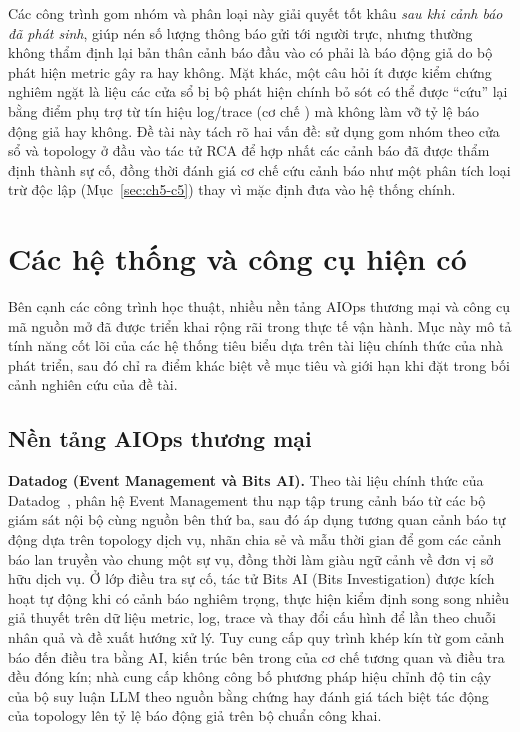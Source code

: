 Các công trình gom nhóm và phân loại này giải quyết tốt khâu \emph{sau khi cảnh báo đã phát sinh}, giúp nén số lượng thông báo gửi tới người trực, nhưng thường không thẩm định lại bản thân cảnh báo đầu vào có phải là báo động giả do bộ phát hiện metric gây ra hay không. Mặt khác, một câu hỏi ít được kiểm chứng nghiêm ngặt là liệu các cửa sổ bị bộ phát hiện chính bỏ sót có thể được ``cứu'' lại bằng điểm phụ trợ từ tín hiệu log/trace (cơ chế ) mà không làm vỡ tỷ lệ báo động giả hay không. Đề tài này tách rõ hai vấn đề: sử dụng gom nhóm theo cửa sổ và topology ở đầu vào tác tử RCA để hợp nhất các cảnh báo đã được \CTAV{} thẩm định thành sự cố, đồng thời đánh giá cơ chế cứu cảnh báo như một phân tích loại trừ độc lập (Mục~\ref{sec:ch5-c5}) thay vì mặc định đưa vào hệ thống chính.

\section{Các hệ thống và công cụ hiện có}
\label{sec:ch3-he-thong}

Bên cạnh các công trình học thuật, nhiều nền tảng AIOps thương mại và công cụ mã nguồn mở đã được triển khai rộng rãi trong thực tế vận hành. Mục này mô tả tính năng cốt lõi của các hệ thống tiêu biểu dựa trên tài liệu chính thức của nhà phát triển, sau đó chỉ ra điểm khác biệt về mục tiêu và giới hạn khi đặt trong bối cảnh nghiên cứu của đề tài.

\subsection{Nền tảng AIOps thương mại}
\label{sec:ch3-thuong-mai}

\textbf{Datadog (Event Management và Bits AI).} Theo tài liệu chính thức của Datadog~\cite{datadog2026docs}, phân hệ Event Management thu nạp tập trung cảnh báo từ các bộ giám sát nội bộ cùng nguồn bên thứ ba, sau đó áp dụng tương quan cảnh báo tự động dựa trên topology dịch vụ, nhãn chia sẻ và mẫu thời gian để gom các cảnh báo lan truyền vào chung một sự vụ, đồng thời làm giàu ngữ cảnh về đơn vị sở hữu dịch vụ. Ở lớp điều tra sự cố, tác tử Bits AI (Bits Investigation) được kích hoạt tự động khi có cảnh báo nghiêm trọng, thực hiện kiểm định song song nhiều giả thuyết trên dữ liệu metric, log, trace và thay đổi cấu hình để lần theo chuỗi nhân quả và đề xuất hướng xử lý. Tuy cung cấp quy trình khép kín từ gom cảnh báo đến điều tra bằng AI, kiến trúc bên trong của cơ chế tương quan và điều tra đều đóng kín; nhà cung cấp không công bố phương pháp hiệu chỉnh độ tin cậy của bộ suy luận LLM theo nguồn bằng chứng hay đánh giá tách biệt tác động của topology lên tỷ lệ báo động giả trên bộ chuẩn công khai.

